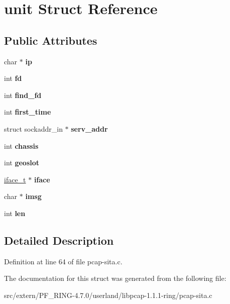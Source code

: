 \hypertarget{structunit}{
\section{unit Struct Reference}
\label{structunit}
}
\subsection*{Public Attributes}
\begin{DoxyCompactItemize}
\item 
\hypertarget{structunit_a25cfbc1559495fa313d448d5d9219931}{
char $\ast$ {\bfseries ip}}
\label{structunit_a25cfbc1559495fa313d448d5d9219931}

\item 
\hypertarget{structunit_a426af298351fbb52951c53052212a9a9}{
int {\bfseries fd}}
\label{structunit_a426af298351fbb52951c53052212a9a9}

\item 
\hypertarget{structunit_af74af4478185abbfd3b3ccbc164ba3e6}{
int {\bfseries find\_\-fd}}
\label{structunit_af74af4478185abbfd3b3ccbc164ba3e6}

\item 
\hypertarget{structunit_a12c1d82528ac543a960a1784c4f6c802}{
int {\bfseries first\_\-time}}
\label{structunit_a12c1d82528ac543a960a1784c4f6c802}

\item 
\hypertarget{structunit_a0863963e1409b0c2a5d47d2e8111b70f}{
struct sockaddr\_\-in $\ast$ {\bfseries serv\_\-addr}}
\label{structunit_a0863963e1409b0c2a5d47d2e8111b70f}

\item 
\hypertarget{structunit_a704348cdfce2c3bf8d0c8707751ceb33}{
int {\bfseries chassis}}
\label{structunit_a704348cdfce2c3bf8d0c8707751ceb33}

\item 
\hypertarget{structunit_a148ff7225e04fcd6135cded7a0dd91fe}{
int {\bfseries geoslot}}
\label{structunit_a148ff7225e04fcd6135cded7a0dd91fe}

\item 
\hypertarget{structunit_a34c6ef7ead1084e95e0d2a91bd4ae6ec}{
\hyperlink{structiface}{iface\_\-t} $\ast$ {\bfseries iface}}
\label{structunit_a34c6ef7ead1084e95e0d2a91bd4ae6ec}

\item 
\hypertarget{structunit_a62af7b0324745092661a49e7b66bca20}{
char $\ast$ {\bfseries imsg}}
\label{structunit_a62af7b0324745092661a49e7b66bca20}

\item 
\hypertarget{structunit_a5d8a053c3a663f5196ed40a4404f35fa}{
int {\bfseries len}}
\label{structunit_a5d8a053c3a663f5196ed40a4404f35fa}

\end{DoxyCompactItemize}


\subsection{Detailed Description}


Definition at line 64 of file pcap-\/sita.c.



The documentation for this struct was generated from the following file:\begin{DoxyCompactItemize}
\item 
src/extern/PF\_\-RING-\/4.7.0/userland/libpcap-\/1.1.1-\/ring/pcap-\/sita.c\end{DoxyCompactItemize}
